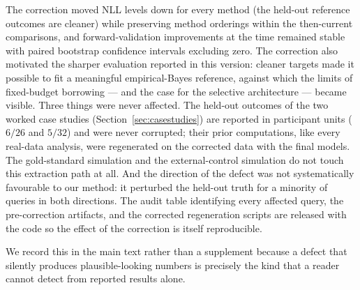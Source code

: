 \documentclass[11pt]{article}
\begin{document}
The correction moved NLL levels down for every method (the held-out reference
outcomes are cleaner) while preserving method orderings within the
then-current comparisons, and forward-validation improvements at the time
remained stable with paired bootstrap confidence intervals excluding zero. The
correction also motivated the sharper evaluation reported in this version:
cleaner targets made it possible to fit a meaningful empirical-Bayes
reference, against which the limits of fixed-budget borrowing --- and the case
for the selective architecture --- became visible. Three
things were never affected. The held-out outcomes of the two worked case
studies (Section~\ref{sec:casestudies}) are reported in participant units
($6/26$ and $5/32$) and were never corrupted; their prior computations, like
every real-data analysis, were regenerated on the corrected data with the
final models. The gold-standard simulation and
the external-control simulation do not touch this extraction path at all. And
the direction of the defect was not systematically favourable to our method: it
perturbed the held-out truth for a minority of queries in both directions. The
audit table identifying every affected query, the pre-correction artifacts, and
the corrected regeneration scripts are released with the code so the effect of
the correction is itself reproducible.

We record this in the main text rather than a supplement because a defect that
silently produces plausible-looking numbers is precisely the kind that a reader
cannot detect from reported results alone.
\end{document}
